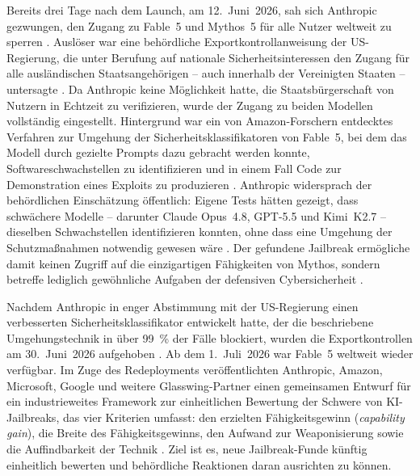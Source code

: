 Bereits drei Tage nach dem Launch, am 12.~Juni~2026, sah sich Anthropic
gezwungen, den Zugang zu Fable~5 und Mythos~5 für alle Nutzer weltweit
zu sperren \cite{anthropic_fable5_access}. Auslöser war eine behördliche
Exportkontrollanweisung der US-Regierung, die unter Berufung auf
nationale Sicherheitsinteressen den Zugang für alle ausländischen
Staatsangehörigen -- auch innerhalb der Vereinigten Staaten -- untersagte
\cite{anthropic_fable5_access}. Da Anthropic keine Möglichkeit hatte,
die Staatsbürgerschaft von Nutzern in Echtzeit zu verifizieren, wurde
der Zugang zu beiden Modellen vollständig eingestellt. Hintergrund war
ein von Amazon-Forschern entdecktes Verfahren zur Umgehung der
Sicherheitsklassifikatoren von Fable~5, bei dem das Modell durch
gezielte Prompts dazu gebracht werden konnte, Softwareschwachstellen
zu identifizieren und in einem Fall Code zur Demonstration eines
Exploits zu produzieren \cite{anthropic_redeploying_fable5}.
Anthropic widersprach der behördlichen Einschätzung öffentlich: Eigene
Tests hätten gezeigt, dass schwächere Modelle -- darunter Claude
Opus~4.8, GPT-5.5 und Kimi~K2.7 -- dieselben Schwachstellen identifizieren
konnten, ohne dass eine Umgehung der Schutzmaßnahmen notwendig gewesen
wäre \cite{anthropic_redeploying_fable5}. Der gefundene Jailbreak ermögliche damit keinen Zugriff auf die
einzigartigen Fähigkeiten von Mythos, sondern betreffe lediglich
gewöhnliche Aufgaben der defensiven Cybersicherheit
\cite{anthropic_fable5_access, anthropic_redeploying_fable5}.

Nachdem Anthropic in enger Abstimmung mit der US-Regierung einen
verbesserten Sicherheitsklassifikator entwickelt hatte, der die
beschriebene Umgehungstechnik in über 99~\% der Fälle blockiert,
wurden die Exportkontrollen am 30.~Juni~2026 aufgehoben
\cite{anthropic_redeploying_fable5}. Ab dem 1.~Juli~2026 war Fable~5
weltweit wieder verfügbar. Im Zuge des Redeployments veröffentlichten
Anthropic, Amazon, Microsoft, Google und weitere Glasswing-Partner
einen gemeinsamen Entwurf für ein industrieweites Framework zur
einheitlichen Bewertung der Schwere von KI-Jailbreaks, das vier
Kriterien umfasst: den erzielten Fähigkeitsgewinn (\emph{capability gain}),
die Breite des Fähigkeitsgewinns, den Aufwand zur Weaponisierung sowie
die Auffindbarkeit der Technik \cite{anthropic_redeploying_fable5}.
Ziel ist es, neue Jailbreak-Funde künftig einheitlich bewerten und
behördliche Reaktionen daran ausrichten zu können.

